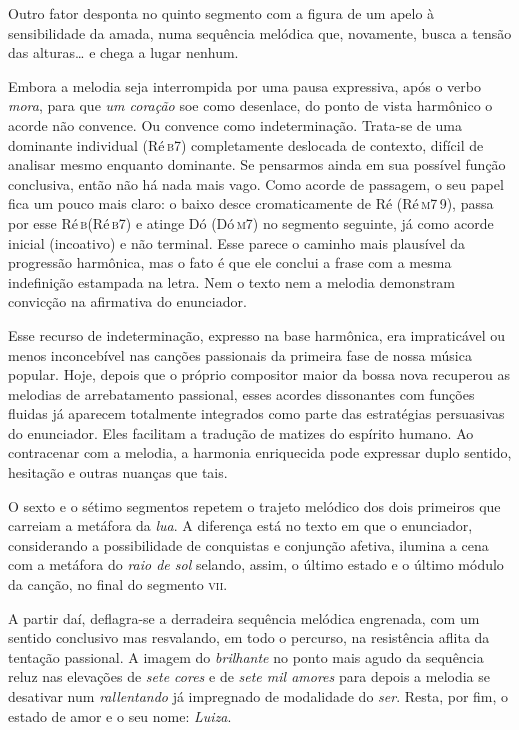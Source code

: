 
Outro fator desponta no quinto segmento com a figura de um apelo à
sensibilidade da amada, numa sequência melódica que, novamente, busca a
tensão das alturas\ldots{} e chega a lugar nenhum.


Embora a melodia seja interrompida por uma pausa expressiva, após o
verbo \textit{mora}, para que \textit{um coração} soe como desenlace, do ponto de
vista harmônico o acorde não convence. Ou convence como indeterminação.
Trata-se de uma dominante individual (Ré\,\textsc{b7}) completamente deslocada de
contexto, difícil de analisar mesmo enquanto dominante. Se pensarmos
ainda em sua possível função conclusiva, então não há nada mais vago.
Como acorde de passagem, o seu papel fica um pouco mais claro: o baixo
desce cromaticamente de Ré (Ré\,\textsc{m7\,9}), passa por esse Ré\,\textsc{b}(Ré\,\textsc{b7}) e atinge
Dó (Dó\,\textsc{m7}) no segmento seguinte, já como acorde inicial (incoativo) e não
terminal. Esse parece o caminho mais plausível da progressão harmônica,
mas o fato é que ele conclui a frase com a mesma indefinição estampada
na letra. Nem o texto nem a melodia demonstram convicção na afirmativa
do enunciador.

Esse recurso de indeterminação, expresso na base harmônica, era
impraticável ou menos inconcebível nas canções passionais da primeira
fase de nossa música popular. Hoje, depois que o próprio compositor
maior da bossa nova recuperou as melodias de arrebatamento passional,
esses acordes dissonantes com funções fluidas já aparecem totalmente
integrados como parte das estratégias persuasivas do enunciador. Eles
facilitam a tradução de matizes do espírito humano. Ao contracenar com a
melodia, a harmonia enriquecida pode expressar duplo sentido, hesitação
e outras nuanças que tais.

O sexto e o sétimo segmentos repetem o trajeto melódico dos dois
primeiros que carreiam a metáfora da \textit{lua}. A diferença está no texto
em que o enunciador, considerando a possibilidade de conquistas e
conjunção afetiva, ilumina a cena com a metáfora do \textit{raio de sol}
selando, assim, o último estado e o último módulo da canção, no final do
segmento \textsc{vii}.


A partir daí, deflagra-se a derradeira sequência melódica engrenada, com
um sentido conclusivo mas resvalando, em todo o percurso, na resistência
aflita da tentação passional. A imagem do \textit{brilhante} no ponto mais
agudo da sequência reluz nas elevações de \textit{sete cores} e de \textit{sete mil
amores} para depois a melodia se desativar num \textit{rallentando} já
impregnado de modalidade do \textit{ser}. Resta, por fim, o estado de amor e o
seu nome: \textit{Luiza}.

